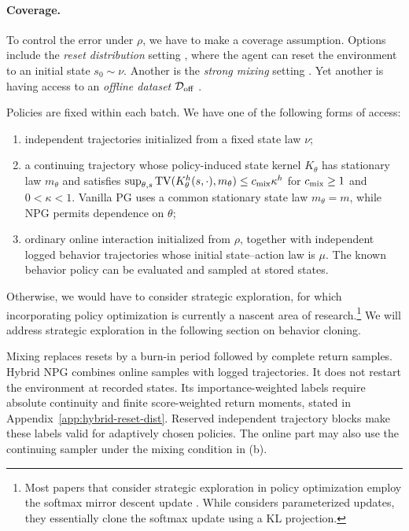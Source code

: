 \paragraph{Coverage.} To control the error under $\rho$, we have to make a coverage assumption. Options include the \emph{reset distribution} setting \citep{kakade2001natural, kakade2002approxoptimalrl, bagnell2003psdp, agarwal2021theory, zhou2023offline}, where the agent can reset the environment to an initial state $s_0 \sim \nu$. Another is the \emph{strong mixing} setting \citep{gaur2023global, wu2022finitetimeanalysistimescale, xu2020improving}. Yet another is having access to an \emph{offline dataset} ${\mathcal{D}}_{{\operatorname{off}}}$ \citep{song2023hybrid, amortila2024harnessing, nakamoto2023calql}.

\begin{aspt}\label{aspt:coverage}
Policies are fixed within each batch. We have one of the following forms of access:
\begin{enumerate}[label=(\alph*),leftmargin=*,itemsep=2pt,topsep=3pt]
\item independent trajectories initialized from a fixed state law $\nu$;
\item a continuing trajectory whose policy-induced state kernel $K_\theta$ has stationary law $m_\theta$ and satisfies $\sup_{\theta,s}\operatorname{TV}(K_\theta^h(s,\cdot),m_\theta)\leq c_{\rm mix}\kappa^h$ for $c_{\rm mix}\geq1$ and $0<\kappa<1$. Vanilla PG uses a common stationary state law $m_\theta=m$, while NPG permits dependence on $\theta$;
\item ordinary online interaction initialized from $\rho$, together with independent logged behavior trajectories whose initial state--action law is $\mu$. The known behavior policy can be evaluated and sampled at stored states.
\end{enumerate}
\end{aspt}
Otherwise, we would have to consider strategic exploration, for which incorporating policy optimization is currently a nascent area of research.\footnote{Most papers that consider strategic exploration in policy optimization employ the softmax mirror descent update \citep{zhong2023theoretical, liu2023optimistic, tan2025actor, sherman2023rate, cassel2024warm}. While \cite{lin2026parametric} considers parameterized updates, they essentially clone the softmax update using a KL projection.} We will address strategic exploration in the following section on behavior cloning.

Mixing replaces resets by a burn-in period followed by complete return samples. Hybrid NPG combines online samples with logged trajectories. It does not restart the environment at recorded states. Its importance-weighted labels require absolute continuity and finite score-weighted return moments, stated in Appendix~\ref{app:hybrid-reset-dist}. Reserved independent trajectory blocks make these labels valid for adaptively chosen policies. The online part may also use the continuing sampler under the mixing condition in (b).

